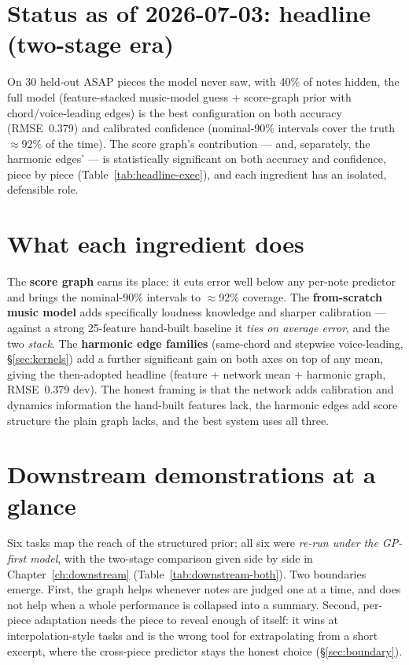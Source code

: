 \documentclass[11pt,a4paper]{report}
\newcommand{\rmseHeadline}{0.379}      %
\newcommand{\covHead}{92\%}            %
\newcommand{\nPieces}{30}
\newcommand{\maskRate}{40\%}
\newcommand{\rmseGP}{0.376}            %
\begin{document}
\section{Status as of 2026-07-03: headline (two-stage era)}
On \nPieces{} held-out ASAP pieces the model never saw, with \maskRate{} of notes
hidden, the full model (feature-stacked music-model guess + score-graph prior with
chord/voice-leading edges) is the best configuration on both accuracy
(RMSE~\rmseHeadline) and calibrated confidence (nominal-90\% intervals cover the
truth $\approx\covHead$ of the time). The score graph's contribution --- and,
separately, the harmonic edges' --- is statistically significant on both accuracy
and confidence, piece by piece (Table~\ref{tab:headline-exec}), and each ingredient
has an isolated, defensible role.

\section{What each ingredient does}
The \textbf{score graph} earns its place: it cuts error well below any per-note
predictor and brings the nominal-90\% intervals to $\approx$92\% coverage. The
\textbf{from-scratch music model} adds specifically loudness knowledge and sharper
calibration --- against a strong 25-feature hand-built baseline it \emph{ties on
average error}, and the two \emph{stack}. The \textbf{harmonic edge families}
(same-chord and stepwise voice-leading, \S\ref{sec:kernels}) add a further
significant gain on both axes on top of any mean, giving the then-adopted headline
(feature + network mean + harmonic graph, RMSE~\rmseHeadline{} dev). The honest framing
is that the network adds calibration and dynamics information the hand-built
features lack, the harmonic edges add score structure the plain graph lacks, and
the best system uses all three.

\section{Downstream demonstrations at a glance}
Six tasks map the reach of the structured prior; all six were \emph{re-run under the
GP-first model}, with the two-stage comparison given side by side in
Chapter~\ref{ch:downstream} (Table~\ref{tab:downstream-both}). Two boundaries
emerge. First, the graph helps whenever notes are judged one at a time, and does not
help when a whole performance is collapsed into a summary. Second, per-piece
adaptation needs the piece to reveal enough of itself: it wins at interpolation-style
tasks and is the wrong tool for extrapolating from a short excerpt, where the
cross-piece predictor stays the honest choice (\S\ref{sec:boundary}).
\end{document}
